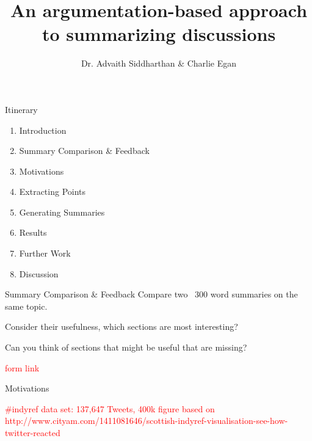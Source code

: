 \documentclass{beamer}
\title{An argumentation-based approach to summarizing discussions}
\date{}
\author{Dr. Advaith Siddharthan \& Charlie Egan}
\institute{University of Aberdeen}
\begin{document}
  \maketitle
  \begin{frame}{Itinerary}
    \begin{enumerate}
      \item{Introduction}
      \item{Summary Comparison \& Feedback}
      \item{Motivations}
      \item{Extracting Points}
      \item{Generating Summaries}
      \item{Results}
      \item{Further Work}
      \item{Discussion}
	\end{enumerate}
  \end{frame}

  \begin{frame}{Summary Comparison \& Feedback}
	Compare two ~300 word summaries on the same topic.

	\vfill

	Consider their usefulness, which sections are most interesting?

	Can you think of sections that might be useful that are missing?

	\textcolor{red}{form link}
  \end{frame}

  \begin{frame}{Motivations}
	\begin{center}



      \textcolor{red}{\#indyref data set: 137,647 Tweets, 400k figure based on http://www.cityam.com/1411081646/scottish-indyref-visualisation-see-how-twitter-reacted}
	\end{center}
  \end{frame}
\end{document}
